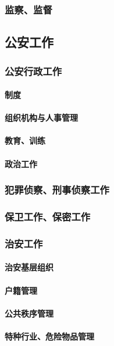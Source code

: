 \documentclass[UTF8]{../RepresentationUniverse}
\begin{document}
    \subsubsection{监察、监督}

\subsection{公安工作}
    \subsubsection{公安行政工作}
        \paragraph{制度}
        \paragraph{组织机构与人事管理}
        \paragraph{教育、训练}
        \paragraph{政治工作}

    \subsubsection{犯罪侦察、刑事侦察工作}
    \subsubsection{保卫工作、保密工作}
    \subsubsection{治安工作}
        \paragraph{治安基层组织}
        \paragraph{户籍管理}
        \paragraph{公共秩序管理}
        \paragraph{特种行业、危险物品管理}
\end{document}

